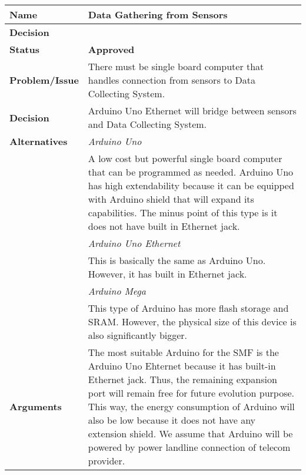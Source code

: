 \begin{table}[H]
	\begin{tabular}{L{0.2\textwidth} L{0.6\textwidth}}
		\textbf{Name}           & \textbf{Data Gathering from Sensors} \\ \toprule
		\textbf{Decision}       & \textbf{}\\ \midrule
		\textbf{Status}         & \textbf{Approved} \\ \midrule
		\textbf{Problem/Issue}  & There must be single board computer that handles connection from sensors to Data Collecting System. \\ \midrule
		\textbf{Decision}       & Arduino Uno Ethernet will bridge between sensors and Data Collecting System.\\ \midrule
		\textbf{Alternatives}   & \textit{Arduino Uno}\\
		& A low cost but powerful single board computer that can be programmed as needed. Arduino Uno has high extendability because it can be equipped with Arduino shield that will expand its capabilities. The minus point of this type is it does not have built in Ethernet jack. \\
		& \textit{Arduino Uno Ethernet}\\
		& This is basically the same as Arduino Uno. However, it has built in Ethernet jack.\\
		& \textit{Arduino Mega}\\
		& This type of Arduino has more flash storage and SRAM. However, the physical size of this device is also significantly bigger.\\
		\midrule
		\textbf{Arguments}      & The most suitable Arduino for the SMF is the Arduino Uno Ehternet because it has built-in Ethernet jack. Thus, the remaining expansion port will remain free for future evolution purpose. This way, the energy consumption of Arduino will also be low because it does not have any extension shield. We assume that Arduino will be powered by power landline connection of telecom provider.
						

\end{tabular}
\end{table}
